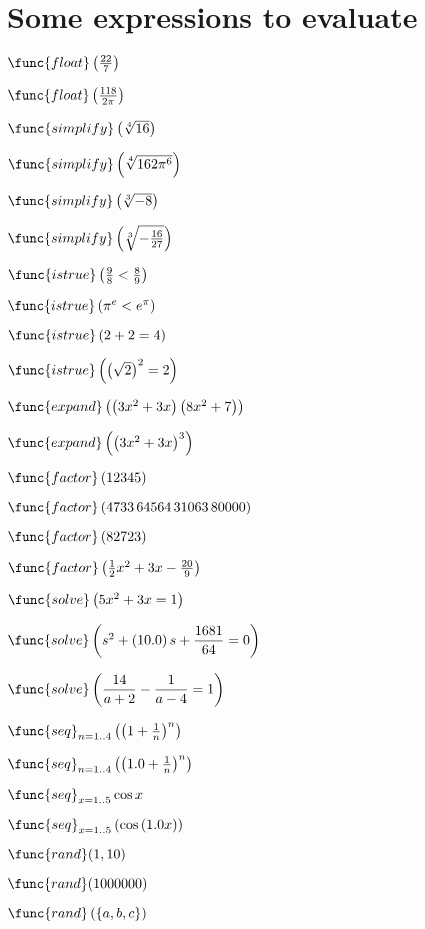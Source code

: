 \documentclass{article}
\begin{document}
\section{Some expressions to evaluate}

$\func{float}\left( \frac{22}{7}\right) $

$\func{float}\left( \frac{118}{2\pi }\right) $

$\func{simplify}\left( \sqrt[4]{16}\right) $

$\func{simplify}\left( \sqrt[4]{162\pi ^{6}}\right) $

$\func{simplify}\left( \sqrt[3]{-8}\right) $

$\func{simplify}\left( \sqrt[3]{-\frac{16}{27}}\right) $

$\func{istrue}\left( \frac{9}{8}<\frac{8}{9}\right) $

$\func{istrue}\left( \pi ^{e}<e^{\pi }\right) $

$\func{istrue}\left( 2+2=4\right) $

$\func{istrue}\left( \left( \sqrt{2}\right) ^{2}=2\right) $

$\func{expand}\left( \left( 3x^{2}+3x\right) \left( 8x^{2}+7\right) \right) $

$\func{expand}\left( \left( 3x^{2}+3x\right) ^{3}\right) $

$\func{factor}\left( 12345\right) $

$\func{factor}\left( 4733\,64564\,31063\,80000\right) $

$\func{factor}\left( 82723\right) $

$\func{factor}\left( \frac{1}{2}x^{2}+3x-\frac{20}{9}\right) $

$\func{solve}\left( 5x^{2}+3x=1\right) $

$\func{solve}\left( s^{2}+\left( 10.0\right) s+\dfrac{1681}{64}=0\right) $

$\func{solve}\left( \dfrac{14}{a+2}-\dfrac{1}{a-4}=1\right) $

$\func{seq}_{n=1..4}\left( \left( 1+\frac{1}{n}\right) ^{n}\right) $

$\func{seq}_{n=1..4}\left( \left( 1.0+\frac{1}{n}\right) ^{n}\right) $

$\func{seq}_{x=1..5}\cos x$

$\func{seq}_{x=1..5}\left( \cos \left( 1.0x\right) \right) $

$\func{rand}(1,10)$

$\func{rand}(1000000)$

$\func{rand}\left( \left\{ a,b,c\right\} \right) $
\end{document}
